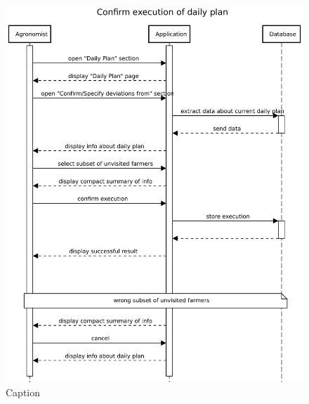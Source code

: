 \begin{figure}[H]
    \centering
    \includegraphics[scale=0.75]{Images/Sequence diagrams/Agronomist - confirm execution of daily plan.pdf}
    \caption{Caption}
    \label{fig:fig:seq_diag_confirm_daily_plan}
\end{figure}